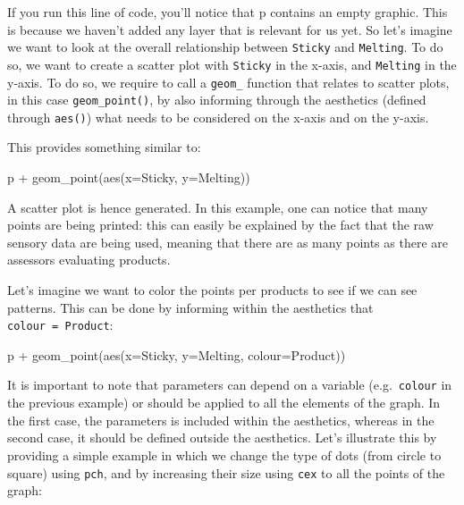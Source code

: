 \documentclass[
]{book}
\newenvironment{Shaded}{\begin{snugshade}}{\end{snugshade}}
\newcommand{\AttributeTok}[1]{\textcolor[rgb]{0.77,0.63,0.00}{#1}}
\newcommand{\FunctionTok}[1]{\textcolor[rgb]{0.00,0.00,0.00}{#1}}
\newcommand{\NormalTok}[1]{#1}
\newcommand{\SpecialCharTok}[1]{\textcolor[rgb]{0.00,0.00,0.00}{#1}}
\begin{document}
If you run this line of code, you'll notice that p contains an empty graphic. This is because we haven't added any layer that is relevant for us yet.
So let's imagine we want to look at the overall relationship between \texttt{Sticky} and \texttt{Melting}. To do so, we want to create a scatter plot with \texttt{Sticky} in the x-axis, and \texttt{Melting} in the y-axis. To do so, we require to call a \texttt{geom\_} function that relates to scatter plots, in this case \texttt{geom\_point()}, by also informing through the aesthetics (defined through \texttt{aes()}) what needs to be considered on the x-axis and on the y-axis.

This provides something similar to:

\begin{Shaded}
\begin{Highlighting}[]
\NormalTok{p }\SpecialCharTok{+} \FunctionTok{geom\_point}\NormalTok{(}\FunctionTok{aes}\NormalTok{(}\AttributeTok{x=}\NormalTok{Sticky, }\AttributeTok{y=}\NormalTok{Melting))}
\end{Highlighting}
\end{Shaded}

A scatter plot is hence generated. In this example, one can notice that many points are being printed: this can easily be explained by the fact that the raw sensory data are being used, meaning that there are as many points as there are assessors evaluating products.

Let's imagine we want to color the points per products to see if we can see patterns. This can be done by informing within the aesthetics that \texttt{colour\ =\ Product}:

\begin{Shaded}
\begin{Highlighting}[]
\NormalTok{p }\SpecialCharTok{+} \FunctionTok{geom\_point}\NormalTok{(}\FunctionTok{aes}\NormalTok{(}\AttributeTok{x=}\NormalTok{Sticky, }\AttributeTok{y=}\NormalTok{Melting, }\AttributeTok{colour=}\NormalTok{Product))}
\end{Highlighting}
\end{Shaded}

It is important to note that parameters can depend on a variable (e.g.~\texttt{colour} in the previous example) or should be applied to all the elements of the graph. In the first case, the parameters is included within the aesthetics, whereas in the second case, it should be defined outside the aesthetics.
Let's illustrate this by providing a simple example in which we change the type of dots (from circle to square) using \texttt{pch}, and by increasing their size using \texttt{cex} to all the points of the graph:
\end{document}

